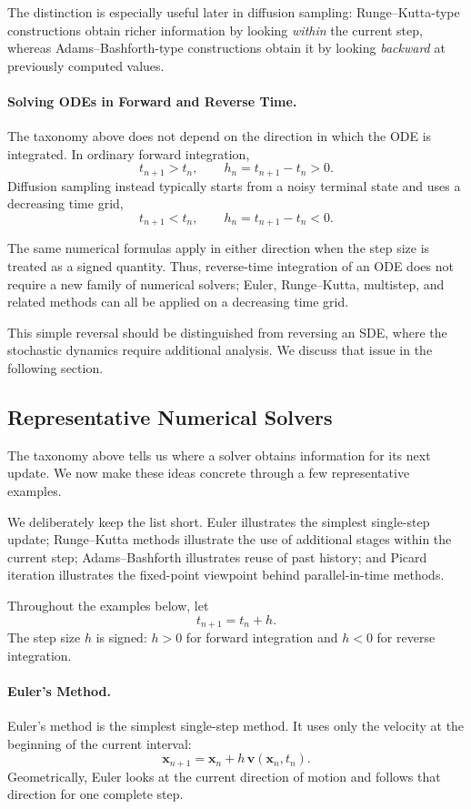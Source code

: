 The distinction is especially useful later in diffusion sampling:
Runge--Kutta-type constructions obtain richer information by looking
\emph{within} the current step, whereas Adams--Bashforth-type constructions
obtain it by looking \emph{backward} at previously computed values.

\paragraph{Solving ODEs in Forward and Reverse Time.}
The taxonomy above does not depend on the direction in which the ODE is
integrated. In ordinary forward integration,
\[
t_{n+1}>t_n,
\qquad
h_n=t_{n+1}-t_n>0.
\]
Diffusion sampling instead typically starts from a noisy terminal state and
uses a decreasing time grid,
\[
t_{n+1}<t_n,
\qquad
h_n=t_{n+1}-t_n<0.
\]

The same numerical formulas apply in either direction when the step size is
treated as a signed quantity. Thus, reverse-time integration of an ODE does
not require a new family of numerical solvers; Euler, Runge--Kutta,
multistep, and related methods can all be applied on a decreasing time grid.

This simple reversal should be distinguished from reversing an SDE, where
the stochastic dynamics require additional analysis. We discuss that issue
in the following section.


\subsection{Representative Numerical Solvers}
\label{app:de-solver-examples}

The taxonomy above tells us where a solver obtains information for its next
update. We now make these ideas concrete through a few representative
examples.

We deliberately keep the list short. Euler illustrates the simplest
single-step update; Runge--Kutta methods illustrate the use of additional
stages within the current step; Adams--Bashforth illustrates reuse of past
history; and Picard iteration illustrates the fixed-point viewpoint behind
parallel-in-time methods.

Throughout the examples below, let
\[
t_{n+1}=t_n+h.
\]
The step size $h$ is signed: $h>0$ for forward integration and $h<0$ for
reverse integration.


\paragraph{Euler's Method.}
Euler's method is the simplest single-step method. It uses only the velocity
at the beginning of the current interval:
\[
\mathbf{x}_{n+1}
=
\mathbf{x}_n
+
h\,\mathbf{v}(\mathbf{x}_n,t_n).
\]
Geometrically, Euler looks at the current direction of motion and follows
that direction for one complete step.

